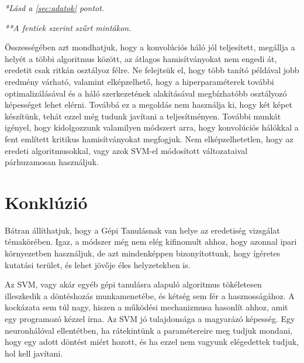\textit{*Lásd a \ref{sec:adatok} pontot.}

\textit{**A fentiek szerint szűrt mintákon.}


Összességében azt mondhatjuk, hogy a konvolúciós háló jól teljesített, megállja a helyét 
a többi algoritmus között, az átlagos hamisítványokat nem engedi át, eredetit csak ritkán 
osztályoz félre. Ne felejtsük el, hogy több tanító példával jobb eredmény várható,
valamint elképzelhető, hogy a hiperparaméterek további optimalizálásával és a háló 
szerkezetének alakításával megbízhatóbb osztályozó képességet lehet elérni. 
Továbbá ez a megoldás nem használja ki, hogy két képet készítünk, tehát ezzel még 
tudunk javítani a teljesítményen. További munkát igényel, hogy kidolgozzunk valamilyen
módszert arra, hogy konvolúciós hálókkal a fent említett kritikus hamisítványokat megfogjuk.
Nem elképzelhetetlen, hogy az eredeti algoritmusokkal, vagy azok SVM-el módosított változataival
párhuzamosan használjuk.




%
%
%
%
%
%
%
%










\newpage
\section{Konklúzió}


Bátran állíthatjuk, hogy a Gépi Tanulásnak van helye az eredetiség vizsgálat témakörében.
Igaz, a módszer még nem elég kifinomult ahhoz, hogy azonnal ipari környezetben használjuk,
de azt mindenképpen bizonyítottunk, hogy ígéretes kutatási terület, és lehet jövője éles 
helyzetekben is.


Az SVM, vagy akár egyéb gépi tanulásra alapuló algoritmus tökéletesen illeszkedik
a döntéshozás munkamenetébe, és kétség sem fér a hasznosságához. A kockázata sem 
túl nagy, hiszen a működési mechanizmusa hasonlít ahhoz, amit egy programozó kézzel írna.
Az SVM jó tulajdonsága a magyarázó képesség. Egy neuronhálóval ellentétben, ha rátekintünk
a paramétereire meg tudjuk mondani, hogy egy adott döntést miért hozott, és ha ezzel nem vagyunk 
elégedettek tudjuk, hol kell javítani.


